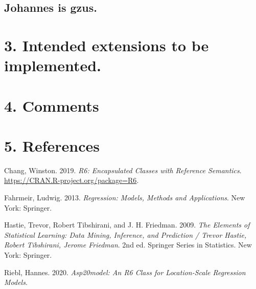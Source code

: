 \documentclass[
]{report}
\begin{document}
\hypertarget{johannes-is-gzus.}{%
\section{Johannes is gzus.}\label{johannes-is-gzus.}}

\hypertarget{intended-extensions-to-be-implemented.}{%
\chapter{3. Intended extensions to be
implemented.}\label{intended-extensions-to-be-implemented.}}

\hypertarget{comments}{%
\chapter{4. Comments}\label{comments}}

\hypertarget{references}{%
\chapter*{5. References}\label{references}}

\hypertarget{refs}{}
\leavevmode\hypertarget{ref-R-R6}{}%
Chang, Winston. 2019. \emph{R6: Encapsulated Classes with Reference
Semantics}. \url{https://CRAN.R-project.org/package=R6}.

\leavevmode\hypertarget{ref-Fahrmeir.2013}{}%
Fahrmeir, Ludwig. 2013. \emph{Regression: Models, Methods and
Applications}. New York: Springer.

\leavevmode\hypertarget{ref-Hastie.2009}{}%
Hastie, Trevor, Robert Tibshirani, and J. H. Friedman. 2009. \emph{The
Elements of Statistical Learning: Data Mining, Inference, and Prediction
/ Trevor Hastie, Robert Tibshirani, Jerome Friedman}. 2nd ed. Springer
Series in Statistics. New York: Springer.

\leavevmode\hypertarget{ref-R-asp20model}{}%
Riebl, Hannes. 2020. \emph{Asp20model: An R6 Class for Location-Scale
Regression Models}.
\end{document}
